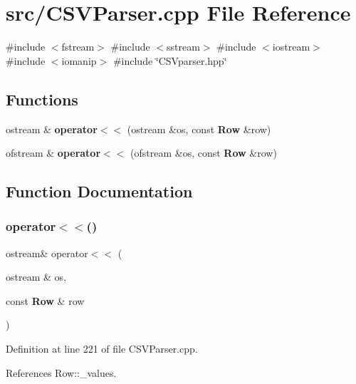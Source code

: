 \section{src/\+C\+S\+V\+Parser.cpp File Reference}
\label{_c_s_v_parser_8cpp}
{\ttfamily \#include $<$fstream$>$}\newline
{\ttfamily \#include $<$sstream$>$}\newline
{\ttfamily \#include $<$iostream$>$}\newline
{\ttfamily \#include $<$iomanip$>$}\newline
{\ttfamily \#include \char`\"{}C\+S\+Vparser.\+hpp\char`\"{}}\newline
\subsection*{Functions}
\begin{DoxyCompactItemize}
\item 
ostream \& \textbf{ operator$<$$<$} (ostream \&os, const \textbf{ Row} \&row)
\item 
ofstream \& \textbf{ operator$<$$<$} (ofstream \&os, const \textbf{ Row} \&row)
\end{DoxyCompactItemize}


\subsection{Function Documentation}
\mbox{\label{_c_s_v_parser_8cpp_a8962fdc6373687757234a811e803a1da}} 
\subsubsection{operator$<$$<$()\hspace{0.1cm}{\footnotesize\ttfamily [1/2]}}
{\footnotesize\ttfamily ostream\& operator$<$$<$ (\begin{DoxyParamCaption}\item[{ostream \&}]{os,  }\item[{const \textbf{ Row} \&}]{row }\end{DoxyParamCaption})}



Definition at line 221 of file C\+S\+V\+Parser.\+cpp.



References Row\+::\+\_\+values.

